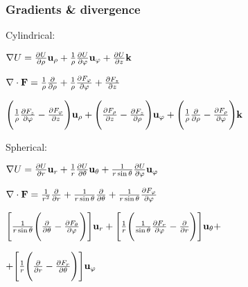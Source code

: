 \subsubsection*{Gradients \& divergence}
Cylindrical:\\
\centerline{$\nabla U=\pdv{U}{\rho}\mathbf{u}_\rho+\frac{1}{\rho}\pdv{U}{\varphi}\mathbf{u}_\varphi+\pdv{U}{z}\mathbf{k}$}
\centerline{$\nabla\cdot\mathbf{F}=\frac{1}{\rho}\pdv{}{\rho}(\rho F_\rho)+\frac{1}{\rho}\pdv{F_\varphi}{\varphi}+\pdv{F_z}{z}$}
\centerline{$\Bigg(\frac{1}{\rho}\pdv{F_z}{\varphi}-\pdv{F_\varphi}{z}\Bigg)\mathbf{u}_\rho+
                    \Bigg(\pdv{F_\rho}{z}-\pdv{F_z}{\rho}\Bigg)\mathbf{u}_\varphi+
                    \Bigg(\frac{1}{\rho}\pdv{}{\rho}(\rho F_\varphi)-\pdv{F_\rho}{\varphi}\Bigg)\mathbf{k}$}
Spherical:\\
\centerline{$\nabla U=\pdv{U}{r}\mathbf{u}_r+\frac{1}{r}\pdv{U}{\theta}\mathbf{u}_\theta+\frac{1}{r\sin{\theta}}\pdv{U}{\varphi}\mathbf{u}_\varphi$}
\centerline{$\nabla\cdot \mathbf{F}=\frac{1}{r^2}\pdv{}{r}(r^2 F_r)+\frac{1}{r\sin{\theta}}\pdv{}{\theta}(\sin{\theta}F_\theta)+\frac{1}{r\sin{\theta}}\pdv{F_\varphi}{\varphi}$}
\centerline{$\Bigg[\frac{1}{r\sin{\theta}}\Bigg(\pdv{}{\theta}(\sin{\theta}F_\varphi)-\pdv{F_\theta}{\varphi}\Bigg)\Bigg]\mathbf{u}_r+
                    \Bigg[\frac{1}{r}\Bigg(\frac{1}{\sin{\theta}}\pdv{F_r}{\varphi}-\pdv{}{r}(r F_\varphi)\Bigg)\Bigg]\mathbf{u}_\theta+
                    $}
\centerline{$+\Bigg[\frac{1}{r}\Bigg(\pdv{}{r}(r F_\theta)-\pdv{F_r}{\theta}\Bigg)\Bigg]\mathbf{u}_\varphi$}












